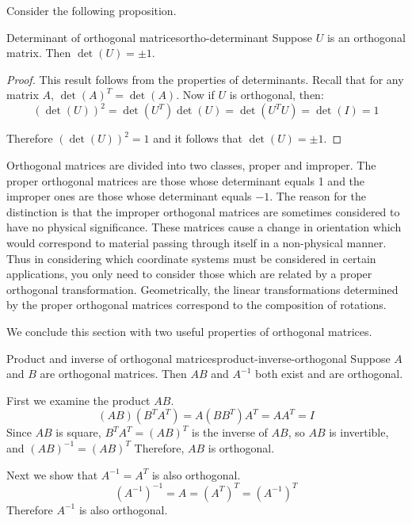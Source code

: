 Consider the following proposition.

\begin{proposition}{Determinant of orthogonal matrices}{ortho-determinant}
Suppose $U$ is an orthogonal matrix. Then $\det (U) = \pm 1$. 
\end{proposition}

\begin{proof}
This result follows from the properties of determinants. Recall that
for any matrix $A$, $\det(A)^T = \det(A)$. Now if $U$ is orthogonal, then:
\begin{equation*}
(\det (U)) ^{2}=\det (U^{T}) \det (U)
=\det (U^{T}U) =\det (I) =1
\end{equation*}

Therefore $(\det (U))^2 = 1$ and it follows that $\det (U) = \pm 1$. 
\end{proof}

Orthogonal matrices are divided into two classes, proper and improper.
The proper orthogonal matrices are those whose determinant equals 1
and the improper ones are those whose determinant equals $-1$. The
reason for the distinction is that the improper orthogonal matrices
are sometimes considered to have no physical significance. These
matrices cause a change in orientation which would correspond to
material passing through itself in a non-physical manner. Thus in
considering which coordinate systems must be considered in certain
applications, you only need to consider those which are related by a
proper orthogonal transformation. Geometrically, the linear
transformations determined by the proper orthogonal matrices
correspond to the composition of rotations.

We conclude this section with two useful properties of orthogonal matrices. 

\begin{example}{Product and inverse of orthogonal matrices}{product-inverse-orthogonal}
Suppose $A$ and $B$ are orthogonal matrices. Then $AB$ and $A^{-1}$ both exist and are orthogonal.
\end{example}

\begin{solution}
First we examine the product $AB$. 
\[ (AB)(B^TA^T)=A(BB^T)A^T =AA^T=I \]
Since $AB$ is square, $B^TA^T=(AB)^T$ is the inverse of
$AB$, so $AB$ is invertible, and $(AB)^{-1}=(AB)^T$
Therefore, $AB$ is orthogonal.

Next we show that $A^{-1}=A^T$ is also orthogonal. 
\[ (A^{-1})^{-1} = A = (A^T)^{T}
=(A^{-1})^{T} \]
Therefore $A^{-1}$ is also orthogonal.
\end{solution}
